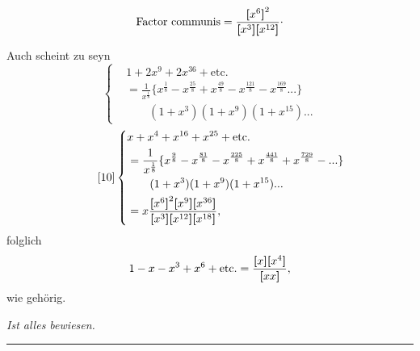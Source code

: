 \[\text{Factor communis}=\frac{\TransBracket{x^6}^2}{\TransBracket{x^3}\TransBracket{x^{12}}}\mathpunct{\raisebox{.5ex}{.}}\]
\par\indent Auch scheint zu seyn
\begin{equation*}\tag*{[9]}
\left\{\begin{aligned}
&1+2x^9+2x^{36}+\text{etc.}\\
&=\frac1{x^{\frac18}}\{x^{\frac18}-x^{\frac{25}8}+x^{\frac{49}8}-x^{\frac{121}8}-x^{\frac{169}8}{.}{.}{.}\}\\
&\qquad(1+x^3)(1+x^9)(1+x^{15}){.}{.}{.}
\end{aligned}\right.
\end{equation*}
\begin{equation*}\tag*{[10]}
\left\{\begin{aligned}
&x+x^4+x^{16}+x^{25}+\text{etc.}\\
&=\frac1{x^{\frac18}}\{x^{\frac98}-x^{\frac{81}8}-x^{\frac{225}8}+x^{\frac{441}8}+x^{\frac{729}8}-{.}{.}{.}\}\\
&\qquad(1+x^3)(1+x^9)(1+x^{15}){.}{.}{.}\\
&=x\frac{\boldsymbol{[}x^6\boldsymbol{]}^2\boldsymbol{[}x^9\boldsymbol{]}\boldsymbol{[}x^{36}\boldsymbol{]}}{\boldsymbol{[}x^3\boldsymbol{]}\boldsymbol{[}x^{12}\boldsymbol{]}\boldsymbol{[}x^{18}\boldsymbol{]}},
\end{aligned}\right.
\end{equation*}
\noindent folglich
\[1-x-x^3+x^6+\text{etc.}=\frac{\boldsymbol{[}x\boldsymbol{]}\boldsymbol{[}x^4\boldsymbol{]}}{\boldsymbol{[}xx\boldsymbol{]}},\]
\noindent wie gehörig.
\begin{center}\textit{Ist alles bewiesen.}\end{center}
\par\smallskip\noindent\rule{.25\linewidth}{.4pt}\par
{\small\par{}\par}
\clearpage
\endgroup
